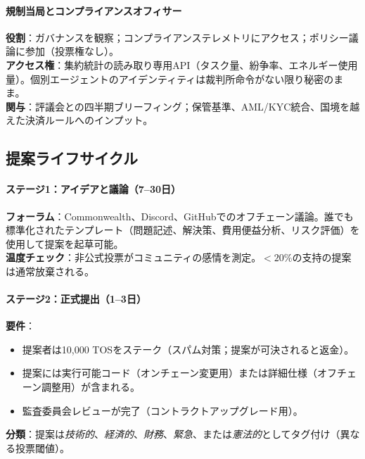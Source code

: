 \documentclass[11pt]{article}
\begin{document}
\paragraph{規制当局とコンプライアンスオフィサー}
\textbf{役割}：ガバナンスを観察；コンプライアンステレメトリにアクセス；ポリシー議論に参加（投票権なし）。\\
\textbf{アクセス権}：集約統計の読み取り専用API（タスク量、紛争率、エネルギー使用量）。個別エージェントのアイデンティティは裁判所命令がない限り秘密のまま。\\
\textbf{関与}：評議会との四半期ブリーフィング；保管基準、AML/KYC統合、国境を越えた決済ルールへのインプット。

\subsection{提案ライフサイクル}

\paragraph{ステージ1：アイデアと議論（7--30日）}
\textbf{フォーラム}：Commonwealth、Discord、GitHubでのオフチェーン議論。誰でも標準化されたテンプレート（問題記述、解決策、費用便益分析、リスク評価）を使用して提案を起草可能。\\
\textbf{温度チェック}：非公式投票がコミュニティの感情を測定。$<20\%$の支持の提案は通常放棄される。

\paragraph{ステージ2：正式提出（1--3日）}
\textbf{要件}：
\begin{itemize}[noitemsep]
  \item 提案者は10,000 TOSをステーク（スパム対策；提案が可決されると返金）。
  \item 提案には実行可能コード（オンチェーン変更用）または詳細仕様（オフチェーン調整用）が含まれる。
  \item 監査委員会レビューが完了（コントラクトアップグレード用）。
\end{itemize}
\textbf{分類}：提案は\emph{技術的}、\emph{経済的}、\emph{財務}、\emph{緊急}、または\emph{憲法的}としてタグ付け（異なる投票閾値）。
\end{document}
